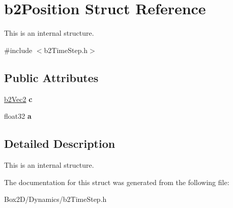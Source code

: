 \hypertarget{structb2_position}{}\section{b2\+Position Struct Reference}
\label{structb2_position}


This is an internal structure.  




{\ttfamily \#include $<$b2\+Time\+Step.\+h$>$}

\subsection*{Public Attributes}
\begin{DoxyCompactItemize}
\item 
\mbox{\label{structb2_position_a64b6d764d272385f84e4cac5ceb5af27}} 
\hyperlink{structb2_vec2}{b2\+Vec2} {\bfseries c}
\item 
\mbox{\label{structb2_position_a19d9362011e8c080059ac7f692cc7d8f}} 
float32 {\bfseries a}
\end{DoxyCompactItemize}


\subsection{Detailed Description}
This is an internal structure. 

The documentation for this struct was generated from the following file\+:\begin{DoxyCompactItemize}
\item 
Box2\+D/\+Dynamics/b2\+Time\+Step.\+h\end{DoxyCompactItemize}
